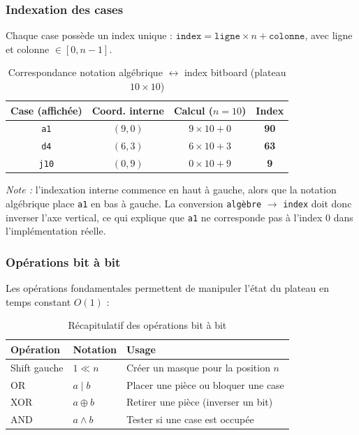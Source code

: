 \documentclass[a4paper]{article}
\providecommand{\toprule}{\hline}
\providecommand{\midrule}{\hline}
\providecommand{\bottomrule}{\hline}
\begin{document}
\subsubsection{Indexation des cases}

Chaque case possède un index unique : $\texttt{index} = \texttt{ligne} \times n + \texttt{colonne}$, avec ligne et colonne $\in [0, n{-}1]$.

\begin{table}[H]
\centering
\begin{tabular}{cccc}
\toprule
\textbf{Case (affichée)} & \textbf{Coord. interne} & \textbf{Calcul ($n=10$)} & \textbf{Index} \\
\midrule
\texttt{a1} & $(9, 0)$ & $9 \times 10 + 0$ & \textbf{90} \\
\texttt{d4} & $(6, 3)$ & $6 \times 10 + 3$ & \textbf{63} \\
\texttt{j10} & $(0, 9)$ & $0 \times 10 + 9$ & \textbf{9} \\
\bottomrule
\end{tabular}
\caption{Correspondance notation algébrique $\leftrightarrow$ index bitboard (plateau $10 \times 10$)}
\end{table}

\textit{Note :} l'indexation interne commence en haut à gauche, alors que la notation algébrique place \texttt{a1} en bas à gauche. La conversion \texttt{algèbre} $\rightarrow$ \texttt{index} doit donc inverser l'axe vertical, ce qui explique que \texttt{a1} ne corresponde pas à l'index 0 dans l'implémentation réelle.

\subsubsection{Opérations bit à bit}

Les opérations fondamentales permettent de manipuler l'état du plateau en temps constant $O(1)$ :

\begin{table}[H]
\centering
\begin{tabular}{lll}
\toprule
\textbf{Opération} & \textbf{Notation} & \textbf{Usage} \\
\midrule
Shift gauche & $1 \ll n$ & Créer un masque pour la position $n$ \\
OR & $a \mid b$ & Placer une pièce ou bloquer une case \\
XOR & $a \oplus b$ & Retirer une pièce (inverser un bit) \\
AND & $a \land b$ & Tester si une case est occupée \\
\bottomrule
\end{tabular}
\caption{Récapitulatif des opérations bit à bit}
\end{table}
\end{document}
